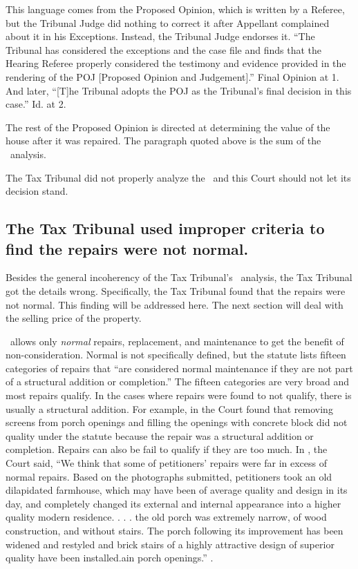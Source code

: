 \documentclass[12pt,\documentclassflag]{michiganCourtOfAppealsBrief}
\def\mathieuGast{\pincite[l]{MCL}{211.27(2)}}
\begin{document}
This language comes from the Proposed Opinion, which is written by a Referee, but the Tribunal Judge did nothing to correct it after Appellant complained about it in his Exceptions. Instead, the Tribunal Judge endorses it. ``The Tribunal has considered the exceptions and the case file and finds that the Hearing Referee properly considered the testimony and evidence provided in the rendering of the POJ [Proposed Opinion and Judgement].'' Final Opinion at 1. And later, ``[T]he Tribunal adopts the POJ as the Tribunal's final decision in this case.'' Id. at 2.

The rest of the Proposed Opinion is directed at determining the value of the house after it was repaired. The paragraph quoted above is the sum of the \mathieuGast\ analysis.

The Tax Tribunal did not properly analyze the \mathieuGast\ and this Court should not let its decision stand. 

\subsection{The Tax Tribunal used improper criteria to find the repairs were not normal.}

Besides the general incoherency of the Tax Tribunal's \mathieuGast\ analysis, the Tax Tribunal got the details wrong. Specifically, the Tax Tribunal found that the repairs were not normal. This finding will be addressed here. The next section will deal with the selling price of the property.

\mathieuGast\ allows only \emph{normal} repairs, replacement, and maintenance to get the benefit of non-consideration. Normal is not specifically defined, but the statute lists fifteen categories of repairs that ``are considered normal maintenance if they are not part of a structural addition or completion.'' The fifteen categories are very broad and most repairs qualify. In the cases where repairs were found to not qualify, there is usually a structural addition. For example, in \cite{Coyne} the Court found that removing screens from porch openings and filling the openings with concrete block did not quality under the statute because the repair was a structural addition or completion. Repairs can also be fail to qualify if they are too much. In \cite{Fisher}, the Court said, ``We think that some of petitioners' repairs were far in excess of normal repairs. Based on the photographs submitted, petitioners took an old dilapidated farmhouse, which may have been of average quality and design in its day, and completely changed its external and internal appearance into a higher quality modern residence. . . . the old porch was extremely narrow, of wood construction, and without stairs. The porch following its improvement has been widened and restyled and brick stairs of a highly attractive design of superior quality have been installed.ain porch openings.'' .
\end{document}
